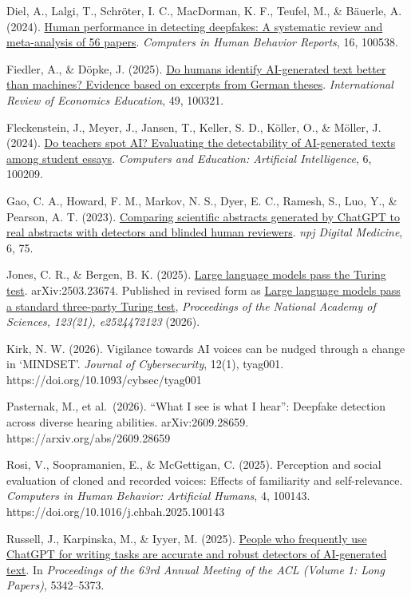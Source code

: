 \documentclass[11pt]{article}
\begin{document}
Diel, A., Lalgi, T., Schröter, I. C., MacDorman, K. F., Teufel, M., \&
Bäuerle, A. (2024).
\href{https://www.sciencedirect.com/science/article/pii/S2451958824001714}{Human
performance in detecting deepfakes: A systematic review and
meta-analysis of 56 papers}. \emph{Computers in Human Behavior Reports},
16, 100538.

Fiedler, A., \& Döpke, J. (2025).
\href{https://www.sciencedirect.com/science/article/pii/S1477388025000131}{Do
humans identify AI-generated text better than machines? Evidence based
on excerpts from German theses}. \emph{International Review of Economics
Education}, 49, 100321.

Fleckenstein, J., Meyer, J., Jansen, T., Keller, S. D., Köller, O., \&
Möller, J. (2024).
\href{https://sciencedirect.com/science/article/pii/S2666920X24000109}{Do
teachers spot AI? Evaluating the detectability of AI-generated texts
among student essays}. \emph{Computers and Education: Artificial
Intelligence}, 6, 100209.

Gao, C. A., Howard, F. M., Markov, N. S., Dyer, E. C., Ramesh, S., Luo,
Y., \& Pearson, A. T. (2023).
\href{https://www.nature.com/articles/s41746-023-00819-6}{Comparing
scientific abstracts generated by ChatGPT to real abstracts with
detectors and blinded human reviewers}. \emph{npj Digital Medicine}, 6,
75.

Jones, C. R., \& Bergen, B. K. (2025).
\href{https://arxiv.org/abs/2503.23674}{Large language models pass the
Turing test}. arXiv:2503.23674. Published in revised form as
\href{https://www.pnas.org/doi/10.1073/pnas.2524472123}{Large language
models pass a standard three-party Turing test}, \emph{Proceedings of
the National Academy of Sciences, 123(21), e2524472123} (2026).

Kirk, N. W. (2026). Vigilance towards AI voices can be nudged through a
change in `MINDSET'. \emph{Journal of Cybersecurity}, 12(1), tyag001.
https://doi.org/10.1093/cybsec/tyag001

Pasternak, M., et al.~(2026). ``What I see is what I hear'': Deepfake
detection across diverse hearing abilities. arXiv:2609.28659.
https://arxiv.org/abs/2609.28659

Rosi, V., Soopramanien, E., \& McGettigan, C. (2025). Perception and
social evaluation of cloned and recorded voices: Effects of familiarity
and self-relevance. \emph{Computers in Human Behavior: Artificial
Humans}, 4, 100143. https://doi.org/10.1016/j.chbah.2025.100143

Russell, J., Karpinska, M., \& Iyyer, M. (2025).
\href{https://aclanthology.org/2025.acl-long.267/}{People who frequently
use ChatGPT for writing tasks are accurate and robust detectors of
AI-generated text}. In \emph{Proceedings of the 63rd Annual Meeting of
the ACL (Volume 1: Long Papers)}, 5342--5373.
\end{document}
